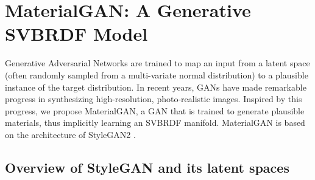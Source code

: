 \section{MaterialGAN: A Generative SVBRDF Model}
\label{sec:svbrdf:gan}

Generative Adversarial Networks \cite{Goodfellow2014} are trained to map an input from a latent space (often randomly sampled from a multi-variate normal distribution) to a plausible instance of the target distribution.
In recent years, GANs have made remarkable progress in synthesizing high-resolution, photo-realistic images. Inspired by this progress, we propose MaterialGAN, a GAN that is trained to generate plausible materials, thus implicitly learning an SVBRDF manifold. MaterialGAN is based on the architecture of StyleGAN2 \cite{StyleGAN2}.


\subsection{Overview of StyleGAN and its latent spaces}
\label{ssec:latent_space}

